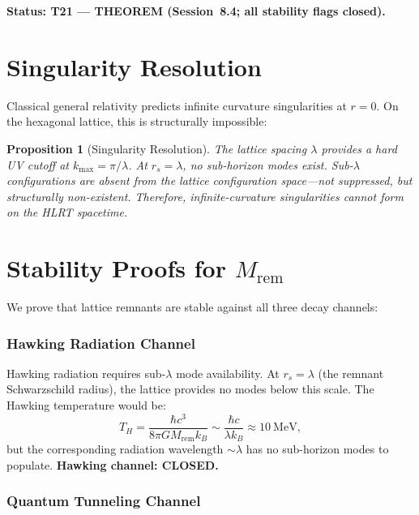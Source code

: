 \documentclass[11pt,letterpaper]{article}
\newtheorem{proposition}[theorem]{Proposition}
\begin{document}
\textbf{Status: T21 --- THEOREM (Session~8.4; all stability flags closed).}

\section{Singularity Resolution}

Classical general relativity predicts infinite curvature singularities
at $r=0$.  On the hexagonal lattice, this is structurally impossible:

\begin{proposition}[Singularity Resolution]
The lattice spacing $\lambda$ provides a hard UV cutoff at
$k_\mathrm{max} = \pi/\lambda$.  At $r_s = \lambda$, no sub-horizon
modes exist.  Sub-$\lambda$ configurations are absent from the lattice
configuration space---not suppressed, but structurally non-existent.
Therefore, infinite-curvature singularities cannot form on the HLRT
spacetime.
\end{proposition}

\section{Stability Proofs for $M_\mathrm{rem}$}

We prove that lattice remnants are stable against all three decay channels:

\subsubsection{Hawking Radiation Channel}

Hawking radiation requires sub-$\lambda$ mode availability.  At
$r_s = \lambda$ (the remnant Schwarzschild radius), the lattice provides
no modes below this scale.  The Hawking temperature would be:
\begin{equation}
  T_H = \frac{\hbar c^3}{8\pi G M_\mathrm{rem} k_B}
  \sim \frac{\hbar c}{\lambda k_B}
  \approx 10~\text{MeV},
\end{equation}
but the corresponding radiation wavelength $\sim\lambda$ has no sub-horizon
modes to populate.  \textbf{Hawking channel: CLOSED.}

\subsubsection{Quantum Tunneling Channel}
\end{document}
